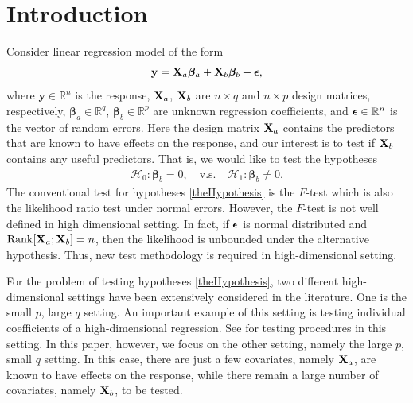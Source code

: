 \documentclass[smallextended]{svjour3}       %
\DeclareMathOperator{\myRank}{Rank}
\newcommand{\By}{\mathbf{y}}    \newcommand{\Bz}{\mathbf{z}}
\newcommand{\bfsym}[1]{\ensuremath{\boldsymbol{#1}}}
\def\bbeta{\bfsym \beta}
\begin{document}
\section{Introduction} 
Consider linear regression model of the form
\begin{equation}\label{label:linearModel}
    \By = 
    \BX_a \bbeta_a + \BX_b \bbeta_b + \bepsilon, %
\end{equation}
where $\By \in \mathbb R^n$ is the response, $\mathbf{X}_a$, $\mathbf{X}_b$ are $n\times q$ and $n\times p$ design matrices, respectively,  $\bbeta_a\in \mathbb R^q$, $\bbeta_b\in \mathbb R^p$ are unknown regression coefficients, and 
$\bepsilon\in \mathbb R^n$ is the vector of random errors.
Here the design matrix $\mathbf{X}_a$ contains the predictors that are known to have effects on the response,
and our interest is to test if $\mathbf{X}_b$ contains any useful predictors.
That is, we would like to test the hypotheses
\begin{align}\label{theHypothesis}
    \mathcal H_0:   \bbeta_b =0,\quad
    \text{v.s.} \quad
    \mathcal H_1:   \bbeta_b \neq 0.
\end{align}
The conventional test for hypotheses \eqref{theHypothesis} is the $F$-test which is also the likelihood ratio test under normal errors.
However, the $F$-test is not well defined in high dimensional setting.
In fact, if $\bepsilon$ is normal distributed and $\myRank[\BX_a;\BX_b]=n$, then the likelihood is unbounded under the alternative hypothesis.
Thus, new test methodology is required in high-dimensional setting.

For the problem of testing hypotheses \eqref{theHypothesis}, two different high-dimensional settings have been extensively considered in the literature.
One is the small $p$, large $q$ setting.
An important example of this setting is testing individual coefficients of a high-dimensional regression.
See \cite{buhlmann2013statistical,Zhang2013,Lan2016} for testing procedures in this setting.
In this paper, however, we focus on the other setting, namely the large $p$, small $q$ setting.
In this case, there are just a few covariates, namely $\mathbf{X}_a$, are known to have effects on the response, while there remain a large number of covariates, namely $\mathbf{X}_b$, to be tested.
\end{document}
